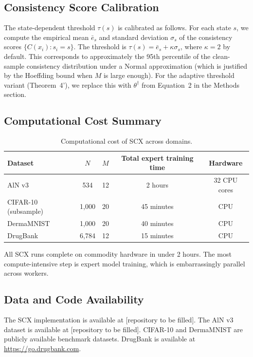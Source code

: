 \documentclass[11pt,a4paper]{article}
\begin{document}
\subsection{Consistency Score Calibration}

The state-dependent threshold $\tau(s)$ is calibrated as follows. For each state $s$, we compute the empirical mean $\bar{e}_s$ and standard deviation $\sigma_s$ of the consistency scores $\{C(x_i) : s_i = s\}$. The threshold is $\tau(s) = \bar{e}_s + \kappa\sigma_s$, where $\kappa = 2$ by default. This corresponds to approximately the 95th percentile of the clean-sample consistency distribution under a Normal approximation (which is justified by the Hoeffding bound when $M$ is large enough). For the adaptive threshold variant (Theorem~4'), we replace this with $\theta^\dagger$ from Equation~2 in the Methods section.

\subsection{Computational Cost Summary}

\begin{table}[H]
\centering
\caption{Computational cost of SCX across domains.}
\label{tab:S4_cost}
\begin{tabular}{lcccc}
\toprule
Dataset & $N$ & $M$ & Total expert training time & Hardware \\
\midrule
AlN v3 & 534 & 12 & 2 hours & 32 CPU cores \\
CIFAR-10 (subsample) & 1,000 & 20 & 45 minutes & CPU \\
DermaMNIST & 1,000 & 20 & 40 minutes & CPU \\
DrugBank & 6,784 & 12 & 15 minutes & CPU \\
\bottomrule
\end{tabular}
\end{table}

All SCX runs complete on commodity hardware in under 2 hours. The most compute-intensive step is expert model training, which is embarrassingly parallel across workers.

\subsection{Data and Code Availability}

The SCX implementation is available at [repository to be filled]. The AlN v3 dataset is available at [repository to be filled]. CIFAR-10 and DermaMNIST are publicly available benchmark datasets. DrugBank is available at \url{https://go.drugbank.com}.
\end{document}
